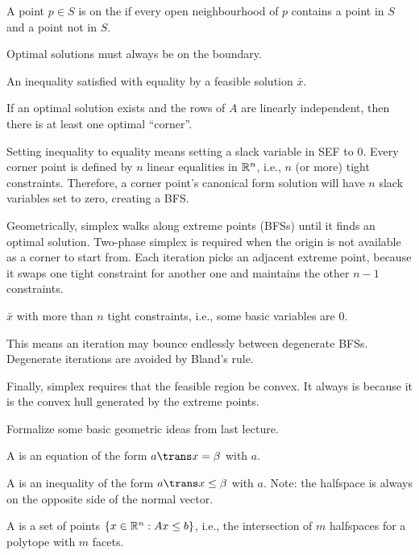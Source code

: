\begin{defn}[boundary]
  A point $p \in S$ is on the 
  if every open neighbourhood of $p$
  contains a point in $S$ and a point not in $S$.
\end{defn}

\begin{remark}
  Optimal solutions must always be on the boundary.
\end{remark}

\begin{defn}
  An inequality satisfied with equality by a feasible solution $\bar x$.
\end{defn}

\begin{theorem}
  If an optimal solution exists and the rows of $A$ are linearly independent,
  then there is at least one optimal ``corner''.
\end{theorem}
\begin{prf}
  Setting inequality to equality means setting a slack variable in SEF to 0.
  Every corner point is defined by $n$ linear equalities in $\mathbb{R}^n$,
  i.e., $n$ (or more) tight constraints.
  Therefore, a corner point's canonical form solution will have
  $n$ slack variables set to zero, creating a BFS.
\end{prf}

Geometrically, simplex walks along extreme points (BFSs) until it finds an optimal solution.
Two-phase simplex is required when the origin is not available as a corner to start from.
Each iteration picks an adjacent extreme point,
because it swaps one tight constraint for another one and maintains the other $n-1$ constraints.

\begin{defn}[degenerate]
  $\bar x$ with more than $n$ tight constraints, i.e., some basic variables are 0.
\end{defn}

This means an iteration may bounce endlessly between degenerate BFSs.
Degenerate iterations are avoided by Bland's rule.

Finally, simplex requires that the feasible region be convex.
It always is because it is the convex hull generated by the extreme points.


Formalize some basic geometric ideas from last lecture.

\begin{defn*}[geometry]
  A  is an equation of the form $a\trans x = \beta$ with
   $a$.

  A  is an inequality of the form $a\trans x \leq \beta$
  with  $a$. Note: the halfspace is always on the
  opposite side of the normal vector.

  A  is a set of points
  $\{x \in \mathbb{R}^n : Ax \leq b\}$, i.e., the intersection of $m$
  halfspaces for a polytope with $m$ facets.
\end{defn*}


